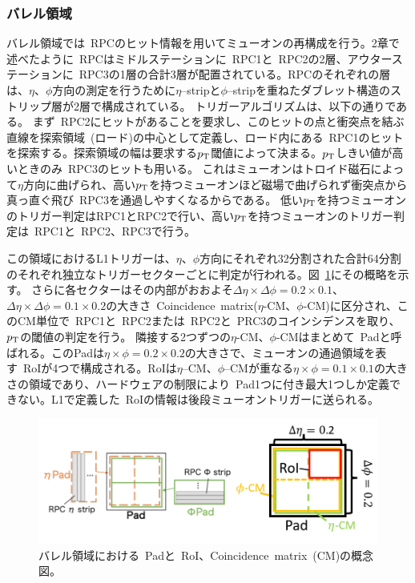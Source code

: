 \subsubsection{バレル領域}
バレル領域では~RPCのヒット情報を用いてミューオンの再構成を行う。2章で述べたように~RPCはミドルステーションに~RPC1と~RPC2の2層、アウターステーションに~RPC3の1層の合計3層が配置されている。RPCのそれぞれの層は、$\eta$、$\phi$方向の測定を行うために$\eta$--stripと$\phi$--stripを重ねたダブレット構造のストリップ層が2層で構成されている。
トリガーアルゴリズムは、以下の通りである。
まず~RPC2にヒットがあることを要求し、このヒットの点と衝突点を結ぶ直線を探索領域~(ロード)の中心として定義し、ロード内にある~RPC1のヒットを探索する。探索領域の幅は要求する$p_\mathrm{T}$閾値によって決まる。$p_\mathrm{T}$しきい値が高いときのみ~RPC3のヒットも用いる。
これはミューオンはトロイド磁石によって$\eta$方向に曲げられ、高い$p_\mathrm{T}$を持つミューオンほど磁場で曲げられず衝突点から真っ直ぐ飛び~RPC3を通過しやすくなるからである。
低い$p_\mathrm{T}$を持つミューオンのトリガー判定はRPC1とRPC2で行い、高い$p_\mathrm{T}$を持つミューオンのトリガー判定は~RPC1と~RPC2、RPC3で行う。

この領域におけるL1トリガーは、$\eta$、$\phi$方向にそれぞれ32分割された合計64分割のそれぞれ独立なトリガーセクターごとに判定が行われる。図~\ref{fig:3-3}にその概略を示す。
さらに各セクターはその内部がおおよそ$\Delta\eta\times\Delta\phi=0.2\times0.1$、$\Delta\eta\times\Delta\phi=0.1\times0.2$の大きさ~Coincidence~matrix($\eta$-CM、$\phi$-CM)に区分され、このCM単位で~RPC1と~RPC2または~RPC2と~PRC3のコインシデンスを取り、$p_\mathrm{T}$の閾値の判定を行う。
隣接する2つずつの$\eta$-CM、$\phi$-CMはまとめて~Padと呼ばれる。このPadは$\eta\times\phi=0.2\times0.2$の大きさで、ミューオンの通過領域を表す~RoIが4つで構成される。RoIは$\eta$--CM、$\phi$--CMが重なる$\eta\times\phi=0.1\times0.1$の大きさの領域であり、ハードウェアの制限により~Pad1つに付き最大1つしか定義できない。L1で定義した~RoIの情報は後段ミューオントリガーに送られる。

\begin{figure}[h]
  \centering
  \includegraphics[clip, width=13cm]{fig/3/L1_RoI_CM.png}
  \caption{バレル領域における~Padと~RoI、Coincidence~matrix~(CM)の概念図。}
  \label{fig:3-3}
\end{figure}

